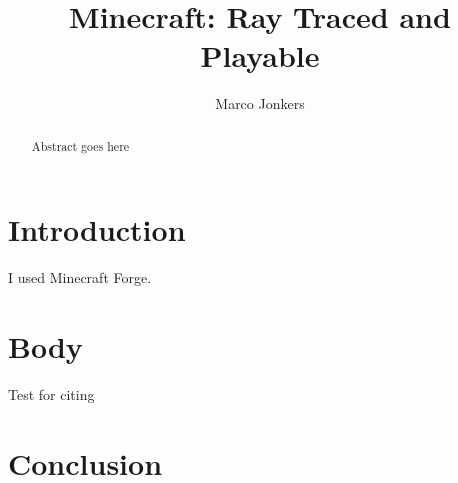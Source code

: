 \documentclass[]{article}
\title{Minecraft: Ray Traced and Playable}
\author{Marco Jonkers}
\begin{document}
\maketitle

\begin{abstract}
Abstract goes here
\end{abstract}

\section{Introduction}
I used Minecraft Forge.

\section{Body}
Test for citing \cite{amanatides1987fast}

\section{Conclusion}

{}

\end{document}
